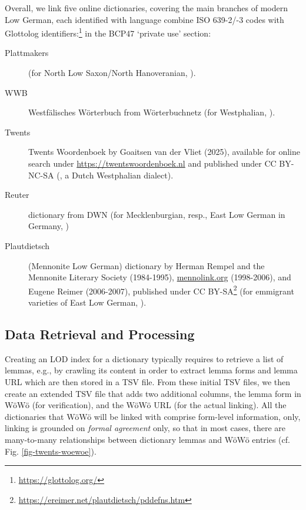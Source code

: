 Overall, we link five online dictionaries, covering the main branches of modern Low German, each identified with language combine ISO 639-2/-3 codes with Glottolog identifiers:\footnote{\url{https://glottolog.org/}} in the BCP47 `private use' section: 

\begin{description}
\item[Plattmakers] (for North Low Saxon/North Hanoveranian, ).
\item[WWB] Westfälisches Wörterbuch from Wörterbuchnetz (for Westphalian, ).
\item[Twents] Twents Woordenboek by Goaitsen van der Vliet (2025), available for online search under \url{https://twentswoordenboek.nl} and published under CC BY-NC-SA (, a Dutch Westphalian dialect).
\item[Reuter] dictionary from DWN (for Mecklenburgian, resp., East Low German in Germany, )
\item[Plautdietsch] (Mennonite Low German) dictionary by Herman Rempel and the Mennonite Literary Society (1984-1995), \url{mennolink.org} (1998-2006), and Eugene Reimer (2006-2007), published under CC BY-SA\footnote{\url{https://ereimer.net/plautdietsch/pddefns.htm}} (for emmigrant varieties of East Low German, ). 
\end{description}

\subsection{Data Retrieval and Processing}

Creating an LOD index for a dictionary typically requires to retrieve a list of lemmas, e.g., by crawling its content in order to extract lemma forms and lemma URL which are then stored in a TSV file. 
From these initial TSV files, we then create an extended TSV file that adds two additional columns, the lemma form in WöWö (for verification), and the WöWö URL (for the actual linking). All the dictionaries that WöWö will be linked with comprise form-level information, only, linking is grounded on \emph{formal agreement} only, so that in most cases, there are many-to-many relationships between dictionary lemmas and WöWö entries (cf. Fig. \ref{fig-twents-woewoe}).

